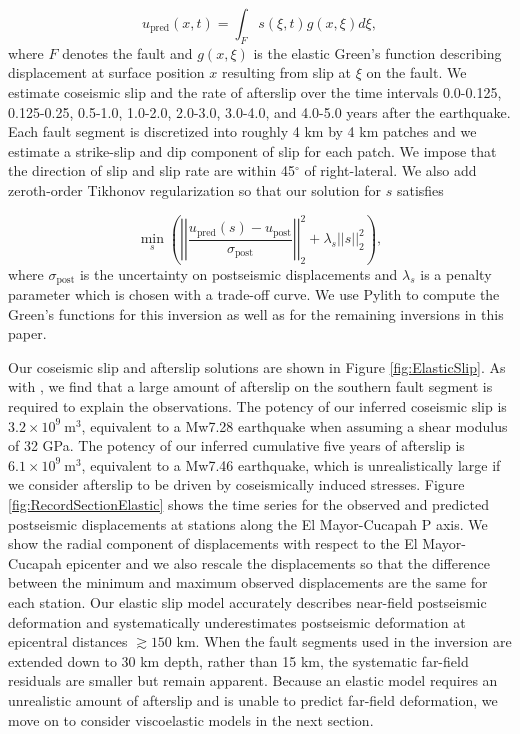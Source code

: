 \documentclass[draft,linenumbers]{AGUJournal}
\begin{document}
\begin{equation}\label{eq:ElasticForward}
  u_\mathrm{pred}(x,t) = \int_F s(\xi,t)g(x,\xi)d\xi, 
\end{equation}           
where $F$ denotes the fault and $g(x,\xi)$ is the elastic Green's function describing displacement at surface position $x$ resulting from slip at $\xi$ on the fault.  We estimate coseismic slip and the rate of afterslip over the time intervals 0.0-0.125, 0.125-0.25, 0.5-1.0, 1.0-2.0, 2.0-3.0, 3.0-4.0, and 4.0-5.0 years after the earthquake.  Each fault segment is discretized into roughly 4 km by 4 km patches and we estimate a strike-slip and dip component of slip for each patch. We impose that the direction of slip and slip rate are within 45$^\circ$ of right-lateral. We also add zeroth-order Tikhonov regularization so that our solution for $s$ satisfies

\begin{equation}\label{eq:ElasticObjective}
  \min_s \left(\left|\left|\frac{u_\mathrm{pred}(s) - u_\mathrm{post}}                
                                {\sigma_\mathrm{post}}\right|\right|_2^2 + 
                                \lambda_s||s||_2^2\right),
\end{equation}
where $\sigma_\mathrm{post}$ is the uncertainty on postseismic displacements and $\lambda_s$ is a penalty parameter which is chosen with a trade-off curve.  We use Pylith \citep{Aagaard2013} to compute the Green's functions for this inversion as well as for the remaining inversions in this paper. 

Our coseismic slip and afterslip solutions are shown in Figure \ref{fig:ElasticSlip}.  As with \citet{Rollins2015}, we find that a large amount of afterslip on the southern fault segment is required to explain the observations. The potency of our inferred coseismic slip is $3.2\times10^9\ \mathrm{m}^3$, equivalent to a Mw7.28 earthquake when assuming a shear modulus of 32 GPa.  The potency of our inferred cumulative five years of afterslip is $6.1\times10^9\ \mathrm{m}^3$, equivalent to a Mw7.46 earthquake, which is unrealistically large if we consider afterslip to be driven by coseismically induced stresses.  Figure \ref{fig:RecordSectionElastic} shows the time series for the observed and predicted postseismic displacements at stations along the El Mayor-Cucapah P axis.  We show the radial component of displacements with respect to the El Mayor-Cucapah epicenter and we also rescale the displacements so that the difference between the minimum and maximum observed displacements are the same for each station.  Our elastic slip model accurately describes near-field postseismic deformation and systematically underestimates postseismic deformation at epicentral distances ${\gtrsim}150$ km.  When the fault segments used in the inversion are extended down to 30 km depth, rather than 15 km, the systematic far-field residuals are smaller but remain apparent. Because an elastic model requires an unrealistic amount of afterslip and is unable to predict far-field deformation, we move on to consider viscoelastic models in the next section.  
\end{document}
